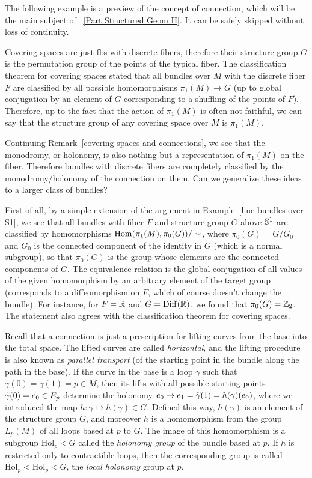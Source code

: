 The following example is a preview of the concept of connection, which will be the main subject of \Part~\ref{Part Structured Geom II}. It can be safely skipped without loss of continuity.

\begin{example}
	Covering spaces are just \glspl{fb} with discrete fibers, therefore their structure group $G$ is the permutation group of the points of the typical fiber. The classification theorem for covering spaces stated that all bundles over $M$ with the discrete fiber $F$ are classified by all possible homomorphisms $\pi_1(M)\to G$ (up to global conjugation by an element of $G$ corresponding to a shuffling of the points of $F$). Therefore, up to the fact that the action of $\pi_1(M)$ is often not faithful, we can say that the structure group of any covering space over $M$ is $\pi_1(M)$.
	
	Continuing Remark~\ref{covering spaces and connections}, we see that the monodromy, or holonomy, is also nothing but a representation of $\pi_1(M)$ on the fiber. Therefore bundles with discrete fibers are completely classified by the monodromy/holonomy of the connection on them. Can we generalize these ideas to a larger class of bundles?
	
	First of all, by a simple extension of the argument in Example~\ref{line bundles over S1}, we see  that all bundles with fiber $F$ and structure group $G$ above $\mathbb{S}^1$ are classified by homomorphisms $\operatorname{Hom}(\pi_1(M),\pi_0(G))/\sim$, where $\pi_0(G)=G/G_0$ and $G_0$ is the connected component of the identity in $G$ (which is a normal subgroup), so that $\pi_0(G)$ is the group whose elements are the connected components of $G$. The equivalence relation is the global conjugation of all values of the given homomorphism by an arbitrary element of the target group (corresponds to a diffeomorphism on $F$, which of course doesn't change the bundle). For instance, for $F=\mathbb{R} $ and $G=\operatorname{Diff}(\mathbb{R} )$, we found that $\pi_0(G)=\mathbb{Z}_2$. The statement also agrees with the classification theorem for covering spaces.
	
	Recall that a connection is just a prescription for lifting curves from the base into the total space. The lifted curves are called \emph{horizontal}, and the lifting procedure is also known as \emph{parallel transport} (of the starting point in the bundle along the path in the base). If the curve in the base is a loop $\gamma$ such that $\gamma(0)=\gamma(1)=p\in M$, then its lifts with all possible starting points $\wt{\gamma}(0)=e_0\in E_p$ determine the holonomy $e_0\mapsto e_1=\wt{\gamma}(1)=h(\gamma)(e_0)$, where we introduced the map $h:\gamma\mapsto h(\gamma)\in G$. Defined this way, $h(\gamma)$ is an element of the structure group $G$, and moreover $h$ is a homomorphism from the group $L_p(M)$ of all loops based at $p$ to $G$. The image of this homomorphism is a subgroup $\mathrm{Hol}_p<G$ called the \emph{holonomy group} of the bundle based at $p$. If $h$ is restricted only to contractible loops, then the corresponding group is called $\widetilde{\mathrm{Hol}}_p<\mathrm{Hol}_p<G$, the \emph{local holonomy} group at $p$. 
	

\end{example}
